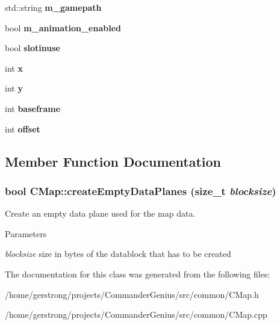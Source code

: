 \begin{DoxyCompactItemize}
\item 
\hypertarget{class_c_map_acb7543bdb51b223376765a1d998d3621}{
std::string {\bfseries m\_\-gamepath}}
\label{class_c_map_acb7543bdb51b223376765a1d998d3621}

\item 
\hypertarget{class_c_map_a1ca6d8a1118cb2c6106f810072660dcf}{
bool {\bfseries m\_\-animation\_\-enabled}}
\label{class_c_map_a1ca6d8a1118cb2c6106f810072660dcf}

\item 
\hypertarget{class_c_map_ac283e0e14ee775ce37dc5c887d39afe7}{
bool {\bfseries slotinuse}}
\label{class_c_map_ac283e0e14ee775ce37dc5c887d39afe7}

\item 
\hypertarget{class_c_map_aee4779620cdba5847de27a4b5f6aca7d}{
int {\bfseries x}}
\label{class_c_map_aee4779620cdba5847de27a4b5f6aca7d}

\item 
\hypertarget{class_c_map_a9afb7451cc380b7c9e64a29ea9b5d126}{
int {\bfseries y}}
\label{class_c_map_a9afb7451cc380b7c9e64a29ea9b5d126}

\item 
\hypertarget{class_c_map_aa7b9a9a016b41ad3da7fdb23276ac8d0}{
int {\bfseries baseframe}}
\label{class_c_map_aa7b9a9a016b41ad3da7fdb23276ac8d0}

\item 
\hypertarget{class_c_map_af13098fa11f0357686674196eab93964}{
int {\bfseries offset}}
\label{class_c_map_af13098fa11f0357686674196eab93964}

\end{DoxyCompactItemize}


\subsection{Member Function Documentation}
\hypertarget{class_c_map_a5f80960c9d557322ac0c887dd3d39a6c}{
\subsubsection[{createEmptyDataPlanes}]{\setlength{\rightskip}{0pt plus 5cm}bool CMap::createEmptyDataPlanes (size\_\-t {\em blocksize})}}
\label{class_c_map_a5f80960c9d557322ac0c887dd3d39a6c}


Create an empty data plane used for the map data. 


\begin{DoxyParams}{Parameters}
\item[{\em blocksize}]size in bytes of the datablock that has to be created \end{DoxyParams}


The documentation for this class was generated from the following files:\begin{DoxyCompactItemize}
\item 
/home/gerstrong/projects/CommanderGenius/src/common/CMap.h\item 
/home/gerstrong/projects/CommanderGenius/src/common/CMap.cpp\end{DoxyCompactItemize}
